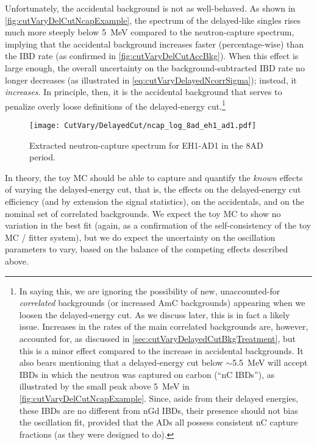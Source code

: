 \documentclass[../thesis.tex]{subfiles}
\begin{document}
Unfortunately, the accidental background is not as well-behaved. As shown in \autoref{fig:cutVaryDelCutNcapExample}, the spectrum of the delayed-like singles rises much more steeply below 5~MeV compared to the neutron-capture spectrum, implying that the accidental background increases faster (percentage-wise) than the IBD rate (as confirmed in \autoref{fig:cutVaryDelCutAccBkg}). When this effect is large enough, the overall uncertainty on the background-subtracted IBD rate no longer decreases (as illustrated in \autoref{eq:cutVaryDelayedNcorrSigma}); instead, it \emph{increases}. In principle, then, it is the accidental background that serves to penalize overly loose definitions of the delayed-energy cut.\footnote{In saying this, we are ignoring the possibility of new, unaccounted-for \emph{correlated} backgrounds (or increased AmC backgrounds) appearing when we loosen the delayed-energy cut. As we discuss later, this is in fact a likely issue. Increases in the rates of the main correlated backgrounds are, however, accounted for, as discussed in \autoref{sec:cutVaryDelayedCutBkgTreatment}, but this is a minor effect compared to the increase in accidental backgrounds. It also bears mentioning that a delayed-energy cut below $\sim$5.5~MeV will accept IBDs in which the neutron was captured on carbon (``nC IBDs''), as illustrated by the small peak above 5~MeV in \autoref{fig:cutVaryDelCutNcapExample}. Since, aside from their delayed energies, these IBDs are no different from nGd IBDs, their presence should not bias the oscillation fit, provided that the ADs all possess consistent nC capture fractions (as they were designed to do).}

\begin{figure}[ht]
  \texttt{[image: CutVary/DelayedCut/ncap\_log\_8ad\_eh1\_ad1.pdf]}
  \caption{Extracted neutron-capture spectrum for EH1-AD1 in the 8AD period.}
  \label{fig:cutVaryDelCutNcapExample}
\end{figure}


In theory, the toy MC should be able to capture and quantify the \emph{known} effects of varying the delayed-energy cut, that is, the effects on the delayed-energy cut efficiency (and by extension the signal statistics), on the accidentals, and on the nominal set of correlated backgrounds. We expect the toy MC to show no variation in the best fit (again, as a confirmation of the self-consistency of the toy MC / fitter system), but we do expect the uncertainty on the oscillation parameters to vary, based on the balance of the competing effects described above.
\end{document}
